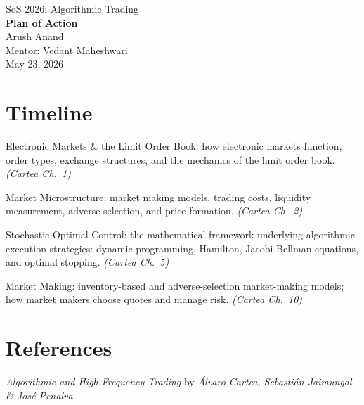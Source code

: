 \documentclass[11pt,a4paper]{article}
\begin{document}
\begin{center}
  {\LARGE SoS 2026: Algorithmic Trading}\\[6pt]
  {\large\textbf{Plan of Action}}\\[10pt]
  Arush Anand\\
  Mentor: Vedant Maheshwari\\[6pt]
  May 23, 2026
\end{center}

\bigskip

\section{Timeline}


\begin{weeklist}

\item[Week 4] Electronic Markets \& the Limit Order Book: how electronic
  markets function, order types, exchange structures, and the mechanics
  of the limit order book. \textit{(Cartea Ch.~1)}

\item[Week 5] Market Microstructure: market making models, trading costs,
  liquidity measurement, adverse selection, and price formation.
  \textit{(Cartea Ch.~2)}

\item[Week 6] Stochastic Optimal Control: the mathematical framework
  underlying algorithmic execution strategies: dynamic programming,
  Hamilton, Jacobi Bellman equations, and optimal stopping.
  \textit{(Cartea Ch.~5)}

\item[Week 7] Market Making: inventory-based and adverse-selection
  market-making models; how market makers choose quotes and manage risk.
  \textit{(Cartea Ch.~10)}

\end{weeklist}

\bigskip

\section{References}

\textit{Algorithmic and High-Frequency Trading} by
\textit{\'Alvaro Cartea, Sebasti\'an Jaimungal \& Jos\'e Penalva}
\end{document}
